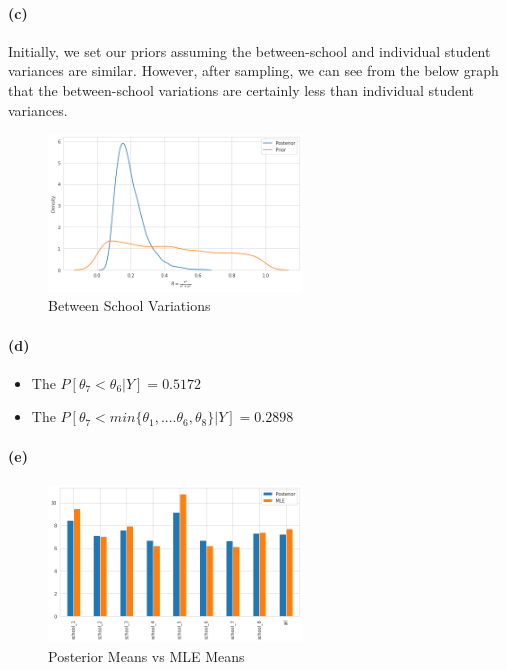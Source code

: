 \documentclass[11pt, letterpaper]{article}
\begin{document}
\newpage
\paragraph{(c)}
Initially, we set our priors assuming the between-school and individual student variances are similar. However, after sampling, we can see from the below graph that the between-school variations are certainly less than individual student variances.
\begin{figure}[!h]
  \centering
  \includegraphics[width=0.6\textwidth]{3.c.png}
  \captionsetup{justification=centering}
  \caption{Between School Variations}
\end{figure}

\paragraph{(d)}
\begin{itemize}
    \item The $P[\theta_7 < \theta_6|Y] = 0.5172$
    \item The $P[\theta_7 < min\{\theta_1, ....\theta_6, \theta_8\}|Y] = 0.2898$
\end{itemize}

\paragraph{(e)}
\begin{figure}[!h]
  \centering
  \includegraphics[width=0.6\textwidth]{3.d.png}
  \captionsetup{justification=centering}
  \caption{Posterior Means vs MLE Means}
\end{figure}
\end{document}
